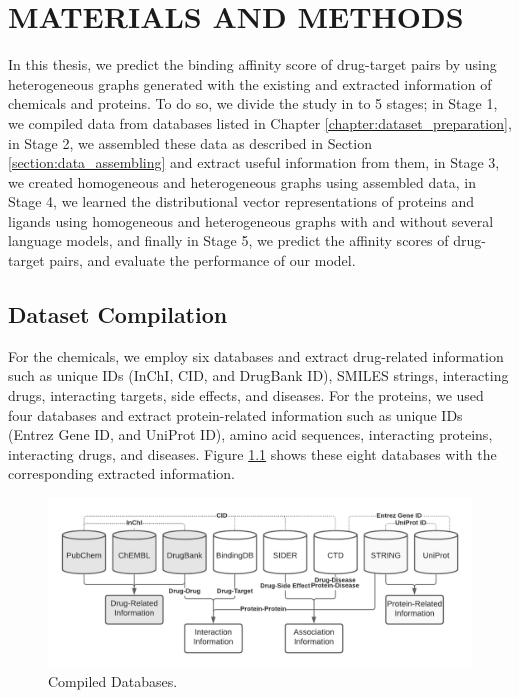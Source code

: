 \chapter{MATERIALS AND METHODS}
In this thesis, we predict the binding affinity score of drug-target pairs by using heterogeneous graphs generated with the existing and extracted information of chemicals and proteins. To do so, we divide the study in to 5 stages; in Stage 1, we compiled data from databases listed in Chapter \ref{chapter:dataset_preparation}, in Stage 2, we assembled these data as described in Section \ref{section:data_assembling} and extract useful information from them, in Stage 3, we created homogeneous and heterogeneous graphs using assembled data, in Stage 4, we learned the distributional vector representations of proteins and ligands using homogeneous and heterogeneous graphs with and without several language models, and finally in Stage 5, we predict the affinity scores of drug-target pairs, and  evaluate the performance of our model.

\section{Dataset Compilation}
For the chemicals, we employ six databases and extract drug-related information such as unique IDs (InChI, CID, and DrugBank ID), SMILES strings, interacting drugs, interacting targets, side effects, and diseases. For the proteins, we used four databases and extract protein-related information such as unique IDs (Entrez Gene ID, and UniProt ID), amino acid sequences, interacting proteins, interacting drugs, and diseases. Figure \ref{fig:databases} shows these eight databases with the corresponding extracted information. 

\begin{figure}
    \centering
        \includegraphics[width=\linewidth]{chapters/materials_and_methods/figures/databases.png}
    \caption{Compiled Databases.}
    \label{fig:databases}
\end{figure}


